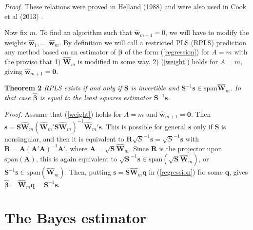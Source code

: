\documentclass[11pt]{article}
\begin{document}
\textit{Proof.} These relations were proved in Helland (1988) and were also used in Cook et al (2013) .
\bigskip

Now fix $m$. To find an algorithm such that $\widehat{\bm{w}}_{m+1}=0$, we will have to modify the weights $\widehat{\bm{w}}_1,...,\widehat{\bm{w}}_m$. By definition we will call a restricted PLS (RPLS) prediction any method based on an estimator of $\bm{\beta}$ of the form (\ref{regression}) for $A=m$ with the proviso that 1) $\widehat{\bm{W}}_{m}$ is modified in some way.  2) (\ref{weight}) holds for $A=m$, giving $\widehat{\bm{w}}_{m+1}=\bm{0}$.


\bigskip

\textbf{Theorem 2} \textit{RPLS exists if and only if $\bm{S}$ is invertible and $\bm{S}^{-1}\bm{s}\in\mathrm{span}\widehat{\bm{W}}_{m}$. In that case $\widehat{\bm{\beta}}$ is equal to the least squares estimator $\bm{S}^{-1}\bm{s}$.}
\bigskip

\textit{Proof.} Assume that (\ref{weight}) holds for $A=m$ and $\widehat{\bm{w}}_{m+1}=\bm{0}$. Then $\bm{s}=\bm{S}\widehat{\bm{W}}_m(\widehat{\bm{W}}_m'\bm{S}\widehat{\bm{W}}_m)^{-1}\widehat{\bm{W}}_m'\bm{s}$. This is possible for general $\bm{s}$ only if $\bm{S}$ is nonsingular, and then it is equivalent to $\bm{R}\sqrt{S}^{-1}\bm{s}=\sqrt{S}^{-1}\bm{s}$ with $\bm{R}=\bm{A}(\bm{A}'\bm{A})^{-1}\bm{A}'$, where $\bm{A}=\sqrt{\bm{S}}\widehat{\bm{W}}_m$. Since $\bm{R}$ is the projector upon $\mathrm{span}(\bm{A})$, this is again equivalent to $\sqrt{\bm{S}}^{-1}\bm{s}\in\mathrm{span}(\sqrt{\bm{S}}\widehat{\bm{W}}_m)$, or $\bm{S}^{-1}\bm{s}\in\mathrm{span}(\widehat{\bm{W}}_m)$. Then, putting $\bm{s}=\bm{S}\widehat{\bm{W}}_m\bm{q}$ in (\ref{regression}) for some $\bm{q}$, gives $\widehat{\bm{\beta}}=\widehat{\bm{W}}_m\bm{q}=\bm{S}^{-1}\bm{s}$.
\bigskip



\section{The Bayes estimator}
\end{document}
